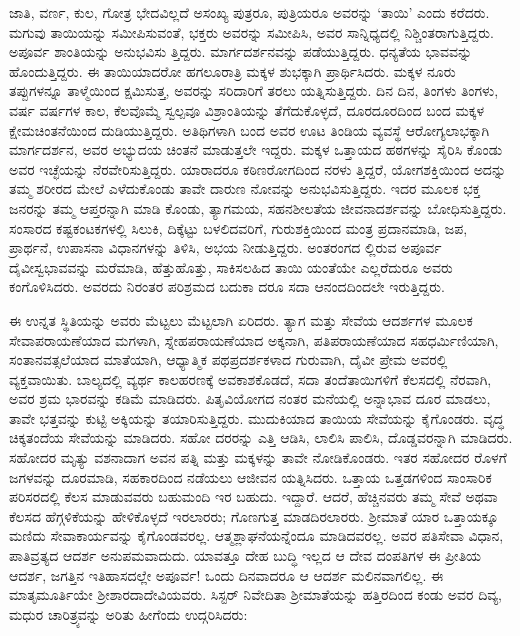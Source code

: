 ಜಾತಿ, ವರ್ಣ, ಕುಲ, ಗೋತ್ರ ಭೇದವಿಲ್ಲದೆ ಅಸಂಖ್ಯ ಪುತ್ರರೂ, ಪುತ್ರಿಯರೂ ಅವರನ್ನು ‘ತಾಯಿ’ ಎಂದು ಕರೆದರು. ಮಗುವು ತಾಯಿಯನ್ನು ಸಮೀಪಿಸುವಂತೆ, ಭಕ್ತರು ಅವರನ್ನು ಸಮೀಪಿಸಿ, ಅವರ ಸಾನ್ನಿಧ್ಯದಲ್ಲಿ ನಿಶ್ಚಿಂತರಾಗುತ್ತಿದ್ದರು. ಅಪೂರ್ವ ಶಾಂತಿಯನ್ನು ಅನುಭವಿಸು ತ್ತಿದ್ದರು. ಮಾರ್ಗದರ್ಶನವನ್ನು ಪಡೆಯುತ್ತಿದ್ದರು. ಧನ್ಯತೆಯ ಭಾವವನ್ನು ಹೊಂದುತ್ತಿದ್ದರು. ಈ ತಾಯಿಯಾದರೋ ಹಗಲೂರಾತ್ರಿ ಮಕ್ಕಳ ಶುಭಕ್ಕಾಗಿ ಪ್ರಾರ್ಥಿಸಿದರು. ಮಕ್ಕಳ ನೂರು ತಪ್ಪುಗಳನ್ನೂ ತಾಳ್ಮೆಯಿಂದ ಕ್ಷಮಿಸುತ್ತ, ಅವರನ್ನು ಸರಿದಾರಿಗೆ ತರಲು ಯತ್ನಿಸುತ್ತಿದ್ದರು. ದಿನ ದಿನ, ತಿಂಗಳು ತಿಂಗಳು, ವರ್ಷ ವರ್ಷಗಳ ಕಾಲ, ಕೆಲವೊಮ್ಮೆ ಸ್ವಲ್ಪವೂ ವಿಶ್ರಾಂತಿಯನ್ನು ತೆಗೆದುಕೊಳ್ಳದೆ, ದೂರದೂರದಿಂದ ಬಂದ ಮಕ್ಕಳ ಕ್ಷೇಮಚಿಂತನೆಯಿಂದ ದುಡಿಯುತ್ತಿದ್ದರು. ಅತಿಥಿಗಳಾಗಿ ಬಂದ ಅವರ ಊಟ ತಿಂಡಿಯ ವ್ಯವಸ್ಥೆ ಆರೋಗ್ಯಲಾಭಕ್ಕಾಗಿ ಮಾರ್ಗದರ್ಶನ, ಅವರ ಅಭ್ಯುದಯ ಚಿಂತನೆ ಮಾಡುತ್ತಲೇ ಇದ್ದರು. ಮಕ್ಕಳ ಒತ್ತಾಯದ ಹಠಗಳನ್ನು ಸೈರಿಸಿ ಕೊಂಡು ಅವರ ಇಚ್ಛೆಯನ್ನು ನೆರವೇರಿಸುತ್ತಿದ್ದರು. ಯಾರಾದರೂ ಕಠಿಣರೋಗದಿಂದ ನರಳು ತ್ತಿದ್ದರೆ, ಯೋಗಶಕ್ತಿಯಿಂದ ಅದನ್ನು ತಮ್ಮ ಶರೀರದ ಮೇಲೆ ಎಳೆದುಕೊಂಡು ತಾವೇ ದಾರುಣ ನೋವನ್ನು ಅನುಭವಿಸುತ್ತಿದ್ದರು. ಇದರ ಮೂಲಕ ಭಕ್ತ ಜನರನ್ನು ತಮ್ಮ ಆಪ್ತರನ್ನಾಗಿ ಮಾಡಿ ಕೊಂಡು, ತ್ಯಾಗಮಯ, ಸಹನಶೀಲತೆಯ ಜೀವನಾದರ್ಶವನ್ನು ಬೋಧಿಸುತ್ತಿದ್ದರು. ಸಂಸಾರದ ಕಷ್ಟಕಂಟಕಗಳಲ್ಲಿ ಸಿಲುಕಿ, ದಿಕ್ಕೆಟ್ಟು ಬಳಲಿದವರಿಗೆ, ಗುರುಶಕ್ತಿಯಿಂದ ಮಂತ್ರ ಪ್ರದಾನಮಾಡಿ, ಜಪ, ಪ್ರಾರ್ಥನೆ, ಉಪಾಸನಾ ವಿಧಾನಗಳನ್ನು ತಿಳಿಸಿ, ಅಭಯ ನೀಡುತ್ತಿದ್ದರು. ಅಂತರಂಗದ ಲ್ಲಿರುವ ಅಪೂರ್ವ ದೈವೀಸ್ವಭಾವವನ್ನು ಮರೆಮಾಡಿ, ಹೆತ್ತುಹೊತ್ತು, ಸಾಕಿಸಲಹಿದ ತಾಯಿ ಯಂತೆಯೇ ಎಲ್ಲರೆದುರೂ ಅವರು ಕಂಗೊಳಿಸಿದರು. ಅವರದು ನಿರಂತರ ಪರಿಶ್ರಮದ ಬದುಕಾ ದರೂ ಸದಾ ಆನಂದದಿಂದಲೇ ಇರುತ್ತಿದ್ದರು.

ಈ ಉನ್ನತ ಸ್ಥಿತಿಯನ್ನು ಅವರು ಮೆಟ್ಟಲು ಮೆಟ್ಟಲಾಗಿ ಏರಿದರು. ತ್ಯಾಗ ಮತ್ತು ಸೇವೆಯ ಆದರ್ಶಗಳ ಮೂಲಕ ಸೇವಾಪರಾಯಣೆಯಾದ ಮಗಳಾಗಿ, ಸ್ನೇಹಪರಾಯಣೆಯಾದ ಅಕ್ಕನಾಗಿ, ಪತಿಪರಾಯಣೆಯಾದ ಸಹಧರ್ಮಿಣಿಯಾಗಿ, ಸಂತಾನವತ್ಸಲೆಯಾದ ಮಾತೆಯಾಗಿ, ಆಧ್ಯಾತ್ಮಿಕ ಪಥಪ್ರದರ್ಶಕಳಾದ ಗುರುವಾಗಿ, ದೈವೀ ಪ್ರೇಮ ಅವರಲ್ಲಿ ವ್ಯಕ್ತವಾಯಿತು. ಬಾಲ್ಯದಲ್ಲಿ ವ್ಯರ್ಥ ಕಾಲಹರಣಕ್ಕೆ ಅವಕಾಶಕೊಡದೆ, ಸದಾ ತಂದೆತಾಯಿಗಳಿಗೆ ಕೆಲಸದಲ್ಲಿ ನೆರವಾಗಿ, ಅವರ ಶ್ರಮ ಭಾರವನ್ನು ಕಡಿಮೆ ಮಾಡಿದರು. ಪಿತೃವಿಯೋಗದ ನಂತರ ಮನೆಯಲ್ಲಿ ಅನ್ನಾಭಾವ ದೂರ ಮಾಡಲು, ತಾವೇ ಭತ್ತವನ್ನು ಕುಟ್ಟಿ ಅಕ್ಕಿಯನ್ನು ತಯಾರಿಸುತ್ತಿದ್ದರು. ಮುದುಕಿಯಾದ ತಾಯಿಯ ಸೇವೆಯನ್ನು ಕೈಗೊಂಡರು. ವೃದ್ಧ ಚಿಕ್ಕತಂದೆಯ ಸೇವೆಯನ್ನು ಮಾಡಿದರು. ಸಹೋ ದರರನ್ನು ಎತ್ತಿ ಆಡಿಸಿ, ಲಾಲಿಸಿ ಪಾಲಿಸಿ, ದೊಡ್ಡವರನ್ನಾಗಿ ಮಾಡಿದರು. ಸಹೋದರ ಮೃತ್ಯು ವಶನಾದಾಗ ಅವನ ಪತ್ನಿ ಮತ್ತು ಮಕ್ಕಳನ್ನು ತಾವೇ ನೋಡಿಕೊಂಡರು. ಇತರ ಸಹೋದರ ರೊಳಗೆ ಜಗಳವನ್ನು ದೂರಮಾಡಿ, ಸಹಕಾರದಿಂದ ನಡೆಯಲು ಆಜೀವನ ಯತ್ನಿಸಿದರು. ಒತ್ತಾಯ ಒತ್ತಡಗಳಿಂದ ಸಾಂಸಾರಿಕ ಪರಿಸರದಲ್ಲಿ ಕೆಲಸ ಮಾಡುವವರು ಬಹುಮಂದಿ ಇರ ಬಹುದು. ಇದ್ದಾರೆ. ಆದರೆ, ಹೆಚ್ಚಿನವರು ತಮ್ಮ ಸೇವೆ ಅಥವಾ ಕೆಲಸದ ಹೆಗ್ಗಳಿಕೆಯನ್ನು ಹೇಳಿಕೊಳ್ಳದೆ ಇರಲಾರರು; ಗೊಣಗುತ್ತ ಮಾಡದಿರಲಾರರು. ಶ‍್ರೀಮಾತೆ ಯಾರ ಒತ್ತಾಯಕ್ಕೂ ಮಣಿದು ಸೇವಾಕಾರ್ಯವನ್ನು ಕೈಗೊಂಡವರಲ್ಲ. ಆತ್ಮಶ್ಲಾಘನೆಯನ್ನೆಂದೂ ಮಾಡಿದವರಲ್ಲ. ಅವರ ಪತಿಸೇವಾ ವಿಧಾನ, ಪಾತಿವ್ರತ್ಯದ ಆದರ್ಶ ಅನುಪಮವಾದುದು. ಯಾವತ್ತೂ ದೇಹ ಬುದ್ಧಿ ಇಲ್ಲದ ಆ ದೇವ ದಂಪತಿಗಳ ಈ ಪ್ರೀತಿಯ ಆದರ್ಶ, ಜಗತ್ತಿನ ಇತಿಹಾಸದಲ್ಲೇ ಅಪೂರ್ವ! ಒಂದು ದಿನವಾದರೂ ಆ ಆದರ್ಶ ಮಲಿನವಾಗಲಿಲ್ಲ. ಈ ಮಾತೃಮೂರ್ತಿಯೇ ಶ‍್ರೀಶಾರದಾದೇವಿಯವರು. ಸಿಸ್ಟರ್ ನಿವೇದಿತಾ ಶ‍್ರೀಮಾತೆಯನ್ನು ಹತ್ತಿರದಿಂದ ಕಂಡು ಅವರ ದಿವ್ಯ, ಮಧುರ ಚಾರಿತ್ರ್ಯವನ್ನು ಅರಿತು ಹೀಗೆಂದು ಉದ್ಗರಿಸಿದರು:

